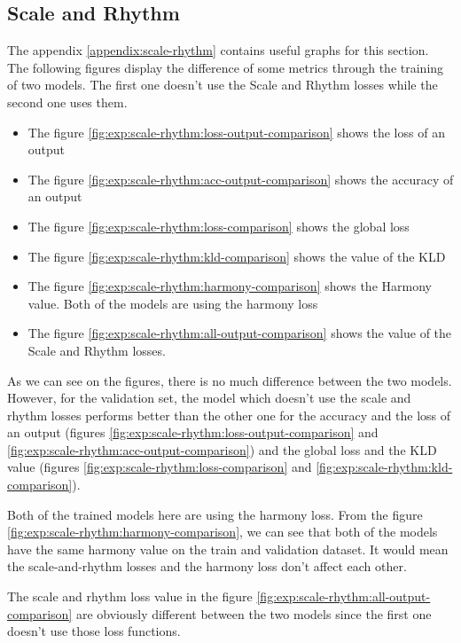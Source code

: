 \documentclass[12pt]{report}
\begin{document}
\subsection{Scale and Rhythm}
\label{sec:exp:scale-rhythm}

The appendix \ref{appendix:scale-rhythm} contains useful graphs for this section.
The following figures display the difference of some metrics through the training of two models. The first one doesn't use the Scale and Rhythm losses while the second one uses them.
\begin{itemize}
    \item The figure \ref{fig:exp:scale-rhythm:loss-output-comparison} shows the loss of an output
    \item The figure     \ref{fig:exp:scale-rhythm:acc-output-comparison} shows the accuracy of an output
    \item The figure     \ref{fig:exp:scale-rhythm:loss-comparison} shows the global loss
    \item The figure \ref{fig:exp:scale-rhythm:kld-comparison} shows the value of the KLD
    \item The figure \ref{fig:exp:scale-rhythm:harmony-comparison} shows the Harmony value. Both of the models are using the harmony loss
    \item The figure \ref{fig:exp:scale-rhythm:all-output-comparison} shows the value of the Scale and Rhythm losses.
\end{itemize}

As we can see on the figures, there is no much difference between the two models.
However, for the validation set, the model which doesn't use the scale and rhythm losses performs better than the other one for the accuracy and the loss of an output (figures \ref{fig:exp:scale-rhythm:loss-output-comparison} and \ref{fig:exp:scale-rhythm:acc-output-comparison}) and the global loss and the KLD value (figures \ref{fig:exp:scale-rhythm:loss-comparison} and \ref{fig:exp:scale-rhythm:kld-comparison}).

Both of the trained models here are using the harmony loss.
From the figure \ref{fig:exp:scale-rhythm:harmony-comparison}, we can see that both of the models have the same harmony value on the train and validation dataset.
It would mean the scale-and-rhythm losses and the harmony loss don't affect each other.

The scale and rhythm loss value in the figure \ref{fig:exp:scale-rhythm:all-output-comparison} are obviously different between the two models since the first one doesn't use those loss functions.
\end{document}
